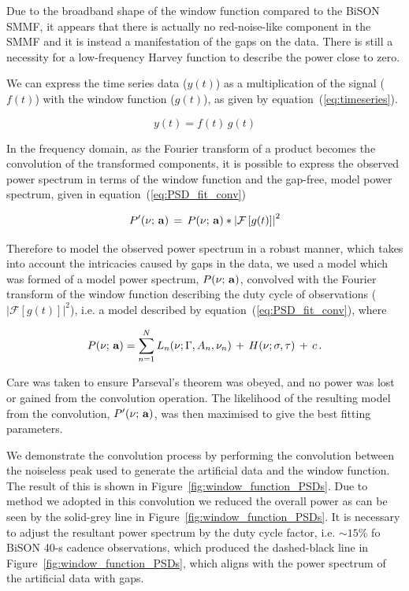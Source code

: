 Due to the broadband shape of the window function compared to the BiSON SMMF, it appears that there is actually no red-noise-like component in the SMMF and it is instead a manifestation of the gaps on the data. There is still a necessity for a low-frequency Harvey function to describe the power close to zero.

We can express the  time series data ($y(t)$) as a multiplication of the signal ($f(t)$) with the window function ($g(t)$), as given by equation~(\ref{eq:timeseries}).

\begin{equation}
y(t)  = f(t) \, g(t)
\label{eq:timeseries}
\end{equation}

In the frequency domain, as the Fourier transform of a product becomes the convolution of the transformed components, it is possible to express the observed power spectrum in terms of the window function and the gap-free, model power spectrum, given in equation~(\ref{eq:PSD_fit_conv})

\begin{equation}
P'(\nu; \,{\bf a}) \, = \, P(\nu; \,{\bf a}) * \left|\mathcal{F}\left[g(t)\right]\right|^2
\label{eq:PSD_fit_conv}
\end{equation}

Therefore to model the observed power spectrum in a robust manner, which takes into account the intricacies caused by gaps in the data, we used a model which was formed of a model power spectrum, $P(\nu; \,{\bf a})$, convolved with the Fourier transform of the window function describing the duty cycle of observations ($\left|\mathcal{F}\left[g(t)\right]\right|^2$), i.e. a model described by equation~(\ref{eq:PSD_fit_conv}), where


\begin{equation}
P(\nu; \,{\bf a}) = \sum_{n=1}^{N} L_n(\nu; \Gamma, A_n, \nu_n) \, + \, H(\nu; \sigma, \tau) \, + \, c \, .
\label{eq:PSD_model}
\end{equation}

Care was taken to ensure Parseval's theorem was obeyed, and no power was lost or gained from the convolution operation. The likelihood of the resulting model from the convolution, $P'(\nu; \,{\bf a})$, was then maximised to give the best fitting parameters.

We demonstrate the convolution process by performing the convolution between the noiseless peak used to generate the artificial data and the window function. The result of this is shown in Figure~\ref{fig:window_function_PSDs}. Due to method we adopted in this convolution we reduced the overall power as can be seen by the solid-grey line in Figure~\ref{fig:window_function_PSDs}. It is necessary to adjust the resultant power spectrum by the duty cycle factor, i.e. $\sim 15\%$ fo BiSON 40-s cadence observations, which produced the dashed-black line in Figure~\ref{fig:window_function_PSDs}, which aligns with the power spectrum of the artificial data with gaps.

